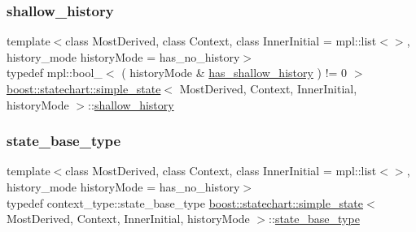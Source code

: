 \mbox{\label{classboost_1_1statechart_1_1simple__state_a7bd6892fa9ec93f9d1384e00c468353d}} 
\subsubsection{\texorpdfstring{shallow\+\_\+history}{shallow\_history}}
{\footnotesize\ttfamily template$<$class Most\+Derived, class Context, class Inner\+Initial = mpl\+::list$<$$>$, history\+\_\+mode history\+Mode = has\+\_\+no\+\_\+history$>$ \\
typedef mpl\+::bool\+\_\+$<$ ( history\+Mode \& \mbox{\hyperlink{namespaceboost_1_1statechart_a9c4ec64d7a0422b8b9c97b489f731372a91f197dd8c8935ec1a9328dfc5f90b43}{has\+\_\+shallow\+\_\+history}} ) != 0 $>$ \mbox{\hyperlink{classboost_1_1statechart_1_1simple__state}{boost\+::statechart\+::simple\+\_\+state}}$<$ Most\+Derived, Context, Inner\+Initial, history\+Mode $>$\+::\mbox{\hyperlink{classboost_1_1statechart_1_1simple__state_a7bd6892fa9ec93f9d1384e00c468353d}{shallow\+\_\+history}}}

\mbox{\label{classboost_1_1statechart_1_1simple__state_ae4af81f8eae996cc418efa3387af0ef6}} 
\subsubsection{\texorpdfstring{state\+\_\+base\+\_\+type}{state\_base\_type}}
{\footnotesize\ttfamily template$<$class Most\+Derived, class Context, class Inner\+Initial = mpl\+::list$<$$>$, history\+\_\+mode history\+Mode = has\+\_\+no\+\_\+history$>$ \\
typedef context\+\_\+type\+::state\+\_\+base\+\_\+type \mbox{\hyperlink{classboost_1_1statechart_1_1simple__state}{boost\+::statechart\+::simple\+\_\+state}}$<$ Most\+Derived, Context, Inner\+Initial, history\+Mode $>$\+::\mbox{\hyperlink{classboost_1_1statechart_1_1simple__state_ae4af81f8eae996cc418efa3387af0ef6}{state\+\_\+base\+\_\+type}}}


